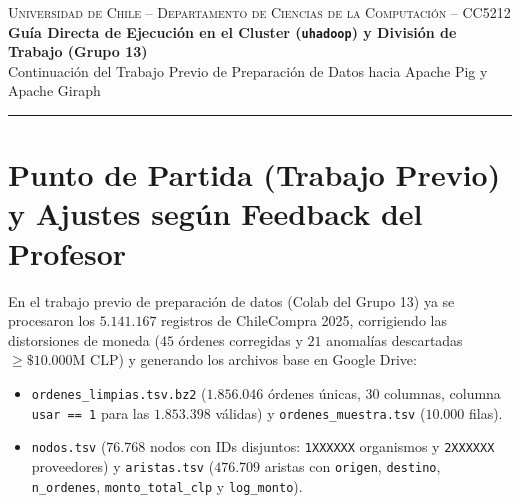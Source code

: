 \documentclass[10pt,letterpaper]{article}
\begin{document}
\sloppy

\begin{center}
    {\scshape\footnotesize Universidad de Chile -- Departamento de Ciencias de la Computación -- CC5212}\\[0.2cm]
    {\Large\bfseries\color{uchileblue} Guía Directa de Ejecución en el Cluster (\texttt{uhadoop}) y División de Trabajo (Grupo 13)}\\[0.15cm]
    {\small Continuación del Trabajo Previo de Preparación de Datos hacia Apache Pig y Apache Giraph}
\end{center}
\vspace{-0.2cm}
\hrule
\vspace{0.25cm}

\section{Punto de Partida (Trabajo Previo) y Ajustes según Feedback del Profesor}

En el trabajo previo de preparación de datos (Colab del Grupo 13) ya se procesaron los $5.141.167$ registros de ChileCompra 2025, corrigiendo las distorsiones de moneda ($45$ órdenes corregidas y $21$ anomalías descartadas $\ge \$10.000\text{M CLP}$) y generando los archivos base en Google Drive:
\begin{itemize}[leftmargin=*, nosep]
    \item \texttt{ordenes\_limpias.tsv.bz2} ($1.856.046$ órdenes únicas, $30$ columnas, columna \texttt{usar == 1} para las $1.853.398$ válidas) y \texttt{ordenes\_muestra.tsv} ($10.000$ filas).
    \item \texttt{nodos.tsv} ($76.768$ nodos con IDs disjuntos: \texttt{1XXXXXX} organismos y \texttt{2XXXXXX} proveedores) y \texttt{aristas.tsv} ($476.709$ aristas con \texttt{origen}, \texttt{destino}, \texttt{n\_ordenes}, \texttt{monto\_total\_clp} y \texttt{log\_monto}).
\end{itemize}
\end{document}

